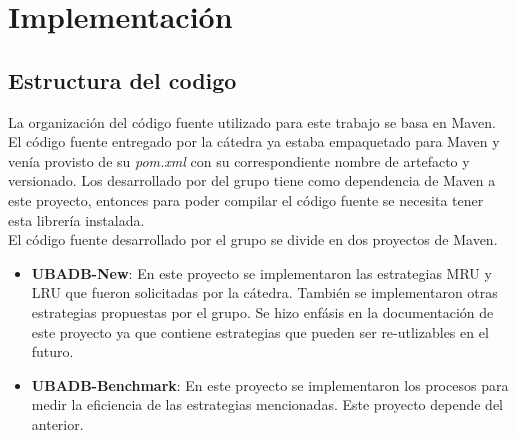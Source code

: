 \section{Implementaci\'on}

\subsection{Estructura del codigo}
La organizaci\'on del c\'odigo fuente utilizado para este trabajo se basa en Maven. El
c\'odigo fuente entregado por la c\'atedra ya estaba empaquetado para Maven y ven\'ia
provisto de su \textit{pom.xml} con su correspondiente nombre de artefacto y versionado.
Los desarrollado por del grupo tiene como dependencia de Maven a este proyecto, entonces 
para poder compilar el c\'odigo fuente se necesita tener esta librer\'ia instalada.\\
El c\'odigo fuente desarrollado por el grupo se divide en dos proyectos de Maven.
\begin{itemize}
\item \textbf{UBADB-New}: En este proyecto se implementaron las estrategias MRU y LRU 
que fueron solicitadas por la c\'atedra. Tambi\'en se implementaron otras estrategias 
propuestas por el grupo. Se hizo enf\'asis en la documentaci\'on de este proyecto ya
que contiene estrategias que pueden ser re-utlizables en el futuro.
\item \textbf{UBADB-Benchmark}: En este proyecto se implementaron los procesos para
medir la eficiencia de las estrategias mencionadas. Este proyecto depende del anterior.
\end{itemize}
  
   
